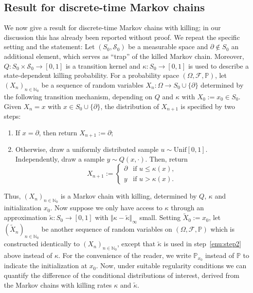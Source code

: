 \documentclass{aptpub}
\begin{document}
\subsection{Result for discrete-time Markov chains}\label{subsec:discrete-time}
We now give a result for discrete-time Markov chains with killing; in our discussion \cite{Rudolf2020}
this has already been reported without proof.
We repeat the specific setting and the statement:
Let $(S_0,\mathcal{S}_0)$ be a measurable space and $\partial\not\in S_0$ an additional element, which serves as ``trap'' of the killed Markov chain. Moreover, $Q\colon S_0\times \mathcal{S}_0 \to [0,1]$ is a transition kernel and $\kappa \colon S_0 \to [0,1]$ is used to describe a state-dependent killing probability. For a probability space $(\Omega,\mathcal{F},\mathbb{P})$, let $(X_n)_{n\in\mathbb{N}_0}$ be a  sequence of random variables $X_n\colon \Omega \to S_0\cup \{\partial \}$ determined by the following transition mechanism, depending on $Q$ and $\kappa$ with $X_0:=x_0\in S_0$. Given $X_n=x$ with $x\in S_0 \cup \{\partial \}$, the distribution of $X_{n+1}$ is specified by two steps:
\begin{enumerate}
    \item If $x=\partial$, then return $X_{n+1}:= \partial$;
    \item \label{enu:step2} Otherwise, draw a uniformly distributed sample $u\sim \textrm{Unif}[0,1]$. Independently, draw a sample $y\sim Q(x,\cdot)$. Then, return
    \[
        X_{n+1}:=
        \begin{cases}
            \partial & \textrm{if } u\leq \kappa(x),\\
            y & \textrm{if } u>\kappa(x).
        \end{cases}
    \]
\end{enumerate}
Thus, $(X_n)_{n\in\mathbb{N}_0}$ is a Markov chain with killing, determined by $Q$, $\kappa$ and initialization $x_0$. Now suppose we only have access to $\kappa$ through an approximation $\widetilde\kappa\colon S_0 \to [0,1]$ with $\Vert \kappa-\widetilde{\kappa} \Vert_\infty$ small. Setting $\widetilde{X}_0 := x_0$, let $(\widetilde{X}_n)_{n\in\mathbb{N}_0}$ be another sequence of random variables on $(\Omega,\mathcal{F},\mathbb{P})$ which is constructed identically to $(X_n)_{n\in\mathbb{N}_0}$, except that
$\widetilde{\kappa}$ is used in step~\ref{enu:step2} above instead of $\kappa$. 
For the convenience of the reader, we write $\mathbb{P}_{x_0}$ instead of $\mathbb{P}$ to indicate the initialization at $x_0$.
Now, under suitable regularity conditions we can quantify the difference of the conditional distributions of interest, derived from the Markov chains with killing rates $\kappa$ and $\widetilde{\kappa}$.
\end{document}
